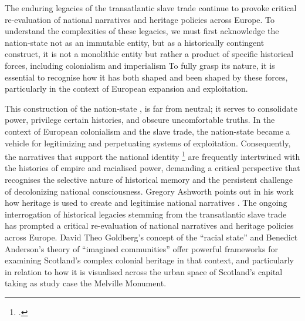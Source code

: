 \documentclass{scrartcl}
\renewcommand{\cite}{\parencite}
\begin{document}
 The enduring legacies of the transatlantic slave trade continue to provoke critical re-evaluation of national narratives and heritage policies across Europe. To understand the complexities of these legacies, we must first acknowledge the nation-state not as an immutable entity, but as a historically contingent construct, it is not a monolithic entity but rather a product of specific historical forces, including colonialism and imperialism 
To fully grasp its nature, it is essential to recognise how it has both shaped and been shaped by these forces, particularly in the context of European expansion and exploitation.

This construction of the nation-state , is far from neutral; it  serves to consolidate power, privilege certain histories, and obscure uncomfortable truths. In the context of European colonialism and the slave trade, the nation-state became a vehicle for legitimizing and perpetuating systems of exploitation. Consequently, the narratives that support the national identity \footcite[``the past was effectively rationalised at the end of 19th century (…)  if you want to create the concept of nation one of your principal instruments is the invention of a Heritage, which can justify, legitimate, demarcate this mythical idea of the nation which have to create them as opposed to us over there who are outside our heritage, so it was effectively rationalised''][]{gregory_ashworth_interview_2008}  are frequently intertwined with the histories of empire and racialised power, demanding a critical perspective that recognises the selective nature of historical memory and the persistent challenge of decolonizing national consciousness. Gregory Ashworth points out in his work how heritage is used to create and legitimise national narratives \cite{gregory_ashworth_interview_2008}.
The ongoing interrogation of historical legacies stemming from the transatlantic slave trade has prompted a critical re-evaluation of national narratives and heritage policies across Europe. 
David Theo Goldberg's concept of the ``racial state'' and Benedict Anderson's theory of ``imagined communities'' offer powerful frameworks for examining Scotland's complex colonial heritage in that context, and particularly in relation to how it is visualised across the urban space of Scotland's capital taking as study case the Melville Monument.
\end{document}
